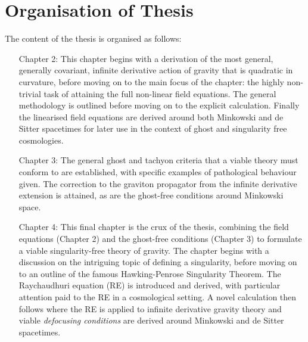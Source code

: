 \section{Organisation of Thesis}
The content of the thesis is organised as follows:
\begin{enumerate}
\item[Chapter 2:] This chapter begins with a derivation of the most general, generally covariant, infinite derivative action of gravity that is quadratic in curvature, before moving on to the main focus of the chapter: the highly non-trivial task of attaining the full non-linear field equations. The general methodology is outlined before moving on to the explicit calculation. Finally the linearised field equations are derived around both Minkowski and de Sitter spacetimes for later use in the context of ghost and singularity free cosmologies.

\item[Chapter 3:] The general ghost and tachyon criteria that a viable theory must conform to are established, with specific examples of pathological behaviour  given. The correction to the graviton propagator from the infinite derivative extension is attained, as are the ghost-free conditions around Minkowski space.

\item[Chapter 4:] This final chapter is the crux of the thesis, combining the field equations (Chapter 2) and the ghost-free conditions (Chapter 3) to formulate a viable singularity-free theory of gravity. The chapter begins with a discussion on the intriguing topic of defining a singularity, before moving on to an outline of the famous Hawking-Penrose Singularity Theorem. The Raychaudhuri equation (RE) is introduced and derived, with particular attention paid to the RE in a cosmological setting. A novel calculation then follows where the RE is applied to infinite derivative gravity theory and viable \emph{defocusing conditions} are derived around Minkowski and de Sitter spacetimes.
\end{enumerate}